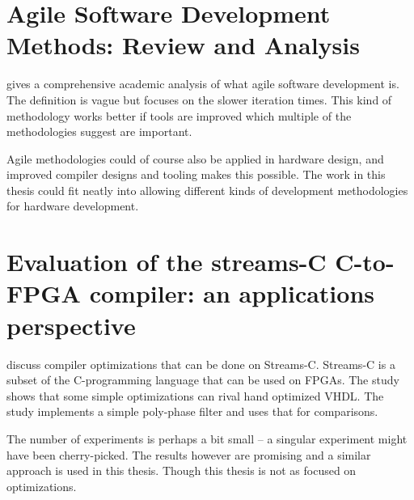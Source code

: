 \cite{src:HLSandOpt}

\section{Agile Software Development Methods: Review and Analysis}
\citeauthor{src:Agile} gives a comprehensive academic analysis of what agile software development is. The definition is vague but focuses on the slower iteration times. This kind of methodology works better if tools are improved which multiple of the methodologies suggest are important. \cite{src:Afile}

Agile methodologies could of course also be applied in hardware design, and improved compiler designs and tooling makes this possible. The work in this thesis could fit neatly into allowing different kinds of development methodologies for hardware development.

\section{Evaluation of the streams-C C-to-FPGA compiler: an applications perspective}
\citeauthor{src:ConFPGA} discuss compiler optimizations that can be done on Streams-C. Streams-C is a subset of the C-programming language that can be used on FPGAs. The study shows that some simple optimizations can rival hand optimized VHDL. The study implements a simple poly-phase filter and uses that for comparisons. \cite{src:ConFPGA}

The number of experiments is perhaps a bit small -- a singular experiment might have been cherry-picked. The results however are promising and a similar approach is used in this thesis. Though this thesis is not as focused on optimizations.


